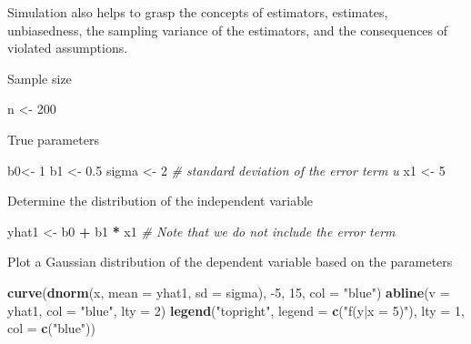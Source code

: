 \documentclass[]{book}
\newenvironment{Shaded}{\begin{snugshade}}{\end{snugshade}}
\newcommand{\CommentTok}[1]{\textcolor[rgb]{0.56,0.35,0.01}{\textit{#1}}}
\newcommand{\DataTypeTok}[1]{\textcolor[rgb]{0.13,0.29,0.53}{#1}}
\newcommand{\DecValTok}[1]{\textcolor[rgb]{0.00,0.00,0.81}{#1}}
\newcommand{\FloatTok}[1]{\textcolor[rgb]{0.00,0.00,0.81}{#1}}
\newcommand{\KeywordTok}[1]{\textcolor[rgb]{0.13,0.29,0.53}{\textbf{#1}}}
\newcommand{\NormalTok}[1]{#1}
\newcommand{\OperatorTok}[1]{\textcolor[rgb]{0.81,0.36,0.00}{\textbf{#1}}}
\newcommand{\StringTok}[1]{\textcolor[rgb]{0.31,0.60,0.02}{#1}}
\begin{document}
Simulation also helps to grasp the concepts of estimators, estimates,
unbiasedness, the sampling variance of the estimators, and the
consequences of violated assumptions.

Sample size

\begin{Shaded}
\begin{Highlighting}[]
\NormalTok{n <-}\StringTok{ }\DecValTok{200}
\end{Highlighting}
\end{Shaded}

True parameters

\begin{Shaded}
\begin{Highlighting}[]
\NormalTok{b0<-}\StringTok{ }\DecValTok{1}
\NormalTok{b1 <-}\StringTok{ }\FloatTok{0.5}
\NormalTok{sigma <-}\StringTok{ }\DecValTok{2} \CommentTok{# standard deviation of the error term u }
\NormalTok{x1 <-}\StringTok{ }\DecValTok{5}
\end{Highlighting}
\end{Shaded}

Determine the distribution of the independent variable

\begin{Shaded}
\begin{Highlighting}[]
\NormalTok{yhat1 <-}\StringTok{ }\NormalTok{b0 }\OperatorTok{+}\StringTok{ }\NormalTok{b1 }\OperatorTok{*}\StringTok{ }\NormalTok{x1 }\CommentTok{#  Note that we do not include the error term }
\end{Highlighting}
\end{Shaded}

Plot a Gaussian distribution of the dependent variable based on the
parameters

\begin{Shaded}
\begin{Highlighting}[]
\KeywordTok{curve}\NormalTok{(}\KeywordTok{dnorm}\NormalTok{(x, }\DataTypeTok{mean =}\NormalTok{ yhat1, }\DataTypeTok{sd =}\NormalTok{ sigma), }\DecValTok{-5}\NormalTok{, }\DecValTok{15}\NormalTok{, }\DataTypeTok{col =} \StringTok{"blue"}\NormalTok{)}
\KeywordTok{abline}\NormalTok{(}\DataTypeTok{v =}\NormalTok{ yhat1, }\DataTypeTok{col =} \StringTok{"blue"}\NormalTok{, }\DataTypeTok{lty =} \DecValTok{2}\NormalTok{)}
\KeywordTok{legend}\NormalTok{(}\StringTok{"topright"}\NormalTok{, }\DataTypeTok{legend =} \KeywordTok{c}\NormalTok{(}\StringTok{"f(y|x = 5)"}\NormalTok{), }\DataTypeTok{lty =} \DecValTok{1}\NormalTok{, }\DataTypeTok{col =} \KeywordTok{c}\NormalTok{(}\StringTok{"blue"}\NormalTok{))}
\end{Highlighting}
\end{Shaded}
\end{document}
